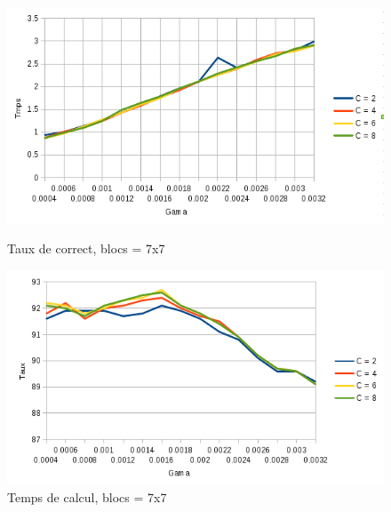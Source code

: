 \documentclass[]{article}   %
\begin{document}
\pagebreak
\begin{figure}[!htb]
  \includegraphics[width=\linewidth]{images/graphique2.png}
  \caption{Taux de correct, blocs = 7x7}\label{fig:awesome_image2}
\endminipage\hfill
{}
  \includegraphics[width=\linewidth]{images/graphique3.png}
  \caption{Temps de calcul, blocs = 7x7}\label{fig:awesome_image3}
\endminipage\hfill
\end{figure}
\end{document}
